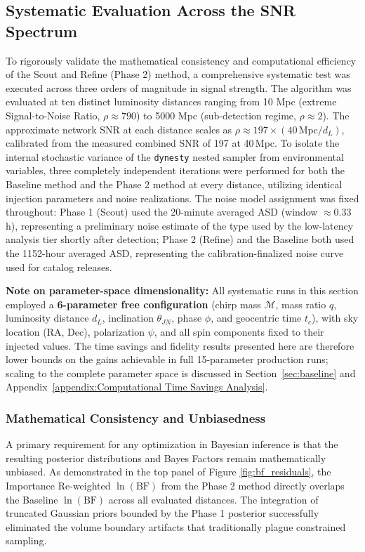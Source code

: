 \documentclass[12pt]{article}
\begin{document}
\subsection{Systematic Evaluation Across the SNR Spectrum}
\label{sec:systematic}
To rigorously validate the mathematical consistency and computational efficiency of the Scout and Refine (Phase 2) method, a comprehensive systematic test was executed across three orders of magnitude in signal strength. The algorithm was evaluated at ten distinct luminosity distances ranging from 10 Mpc (extreme Signal-to-Noise Ratio, $\rho \approx 790$) to 5000 Mpc (sub-detection regime, $\rho \approx 2$). The approximate network SNR at each distance scales as $\rho \approx 197 \times (40\,\mathrm{Mpc} / d_L)$, calibrated from the measured combined SNR of 197 at 40\,Mpc. To isolate the internal stochastic variance of the \texttt{dynesty} nested sampler from environmental variables, three completely independent iterations were performed for both the Baseline method and the Phase 2 method at every distance, utilizing identical injection parameters and noise realizations. The noise model assignment was fixed throughout: Phase 1 (Scout) used the 20-minute averaged ASD (window $\approx 0.33$\,h), representing a preliminary noise estimate of the type used by the low-latency analysis tier shortly after detection; Phase 2 (Refine) and the Baseline both used the 1152-hour averaged ASD, representing the calibration-finalized noise curve used for catalog releases.

\textbf{Note on parameter-space dimensionality:} All systematic runs in this section employed a \textbf{6-parameter free configuration} (chirp mass $\mathcal{M}$, mass ratio $q$, luminosity distance $d_L$, inclination $\theta_{JN}$, phase $\phi$, and geocentric time $t_c$), with sky location (RA, Dec), polarization $\psi$, and all spin components fixed to their injected values. The time savings and fidelity results presented here are therefore lower bounds on the gains achievable in full 15-parameter production runs; scaling to the complete parameter space is discussed in Section~\ref{sec:baseline} and Appendix~\ref{appendix:Computational Time Savings Analysis}.

\subsubsection{Mathematical Consistency and Unbiasedness}
A primary requirement for any optimization in Bayesian inference is that the resulting posterior distributions and Bayes Factors remain mathematically unbiased. As demonstrated in the top panel of Figure \ref{fig:bf_residuals}, the Importance Re-weighted $\ln(\text{BF})$ from the Phase 2 method directly overlaps the Baseline $\ln(\text{BF})$ across all evaluated distances. The integration of truncated Gaussian priors bounded by the Phase 1 posterior successfully eliminated the volume boundary artifacts that traditionally plague constrained sampling.
\end{document}
